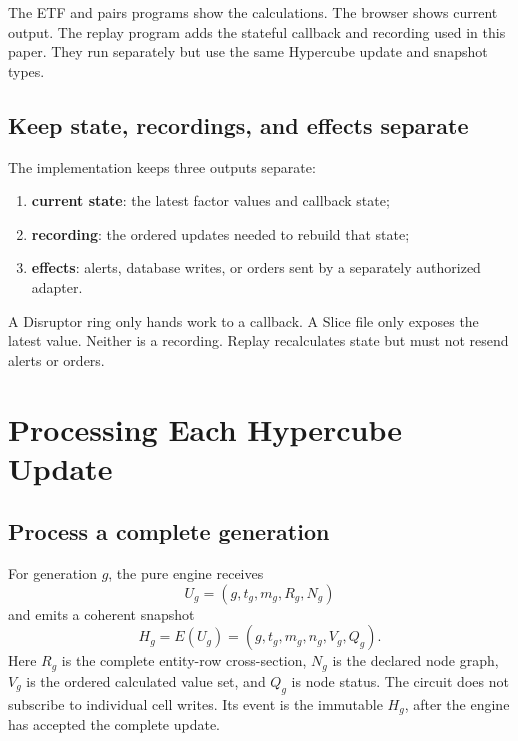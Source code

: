 \documentclass{strategynet-journal}
\newcommand{\SLICE}{\textsf{Slice}}
\begin{document}
The ETF and pairs programs show the calculations.  The browser shows current
output.  The replay program adds the stateful callback and recording used in
this paper.  They run separately but use the same Hypercube update and
snapshot types.

\subsection{Keep state, recordings, and effects separate}

The implementation keeps three outputs separate:
\begin{enumerate}
  \item \textbf{current state}: the latest factor values and callback state;
  \item \textbf{recording}: the ordered updates needed to rebuild that state;
  \item \textbf{effects}: alerts, database writes, or orders sent by a
        separately authorized adapter.
\end{enumerate}

A Disruptor ring only hands work to a callback.  A \SLICE{} file only exposes
the latest value.  Neither is a recording.  Replay recalculates state but must
not resend alerts or orders.

\section{Processing Each Hypercube Update}

\subsection{Process a complete generation}

For generation \(g\), the pure engine receives
\[
  U_g=(g,t_g,m_g,R_g,N_g)
\]
and emits a coherent snapshot
\[
  H_g=E(U_g)=(g,t_g,m_g,n_g,V_g,Q_g).
\]
Here \(R_g\) is the complete entity-row cross-section, \(N_g\) is the declared
node graph, \(V_g\) is the ordered calculated value set, and \(Q_g\) is node
status.  The circuit does not subscribe to individual cell writes.  Its event
is the immutable \(H_g\), after the engine has accepted the complete update.
\end{document}
